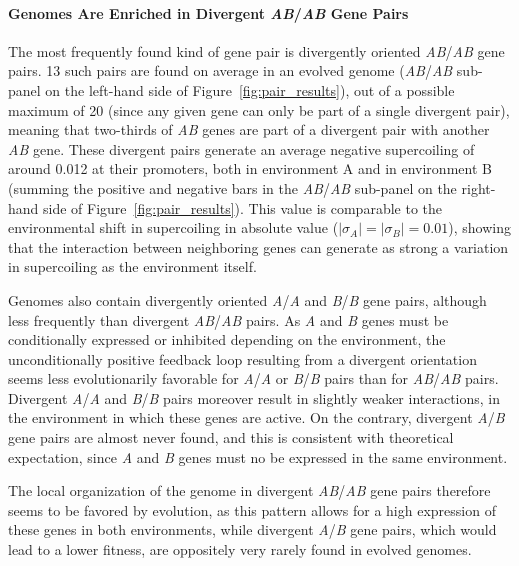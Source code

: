 \paragraph{Genomes Are Enriched in Divergent \emph{AB}/\emph{AB} Gene Pairs}
The most frequently found kind of gene pair is divergently oriented \emph{AB}/\emph{AB} gene pairs.
13 such pairs are found on average in an evolved genome (\emph{AB}/\emph{AB} sub-panel on the left-hand side of Figure~\ref{fig:pair_results}), out of a possible maximum of 20 (since any given gene can only be part of a single divergent pair), meaning that two-thirds of \emph{AB} genes are part of a divergent pair with another \emph{AB} gene.
These divergent pairs generate an average negative supercoiling of around 0.012 at their promoters, both in environment A and in environment B (summing the positive and negative bars in the \emph{AB}/\emph{AB} sub-panel on the right-hand side of Figure~\ref{fig:pair_results}).
This value is comparable to the environmental shift in supercoiling in absolute value ($|\sigma_A| = |\sigma_B| = 0.01$), showing that the interaction between neighboring genes can generate as strong a variation in supercoiling as the environment itself.

Genomes also contain divergently oriented \emph{A}/\emph{A} and \emph{B}/\emph{B} gene pairs, although less frequently than divergent \emph{AB}/\emph{AB} pairs.
As \emph{A} and \emph{B} genes must be conditionally expressed or inhibited depending on the environment, the unconditionally positive feedback loop resulting from a divergent orientation seems less evolutionarily favorable for \emph{A}/\emph{A} or \emph{B}/\emph{B} pairs than for \emph{AB}/\emph{AB} pairs.
Divergent \emph{A}/\emph{A} and \emph{B}/\emph{B} pairs moreover result in slightly weaker interactions, in the environment in which these genes are active.
On the contrary, divergent \emph{A}/\emph{B} gene pairs are almost never found, and this is consistent with theoretical expectation, since \emph{A} and \emph{B} genes must no be expressed in the same environment.

The local organization of the genome in divergent \emph{AB}/\emph{AB} gene pairs therefore seems to be favored by evolution, as this pattern allows for a high expression of these genes in both environments, while divergent \emph{A}/\emph{B} gene pairs, which would lead to a lower fitness, are oppositely very rarely found in evolved genomes.

